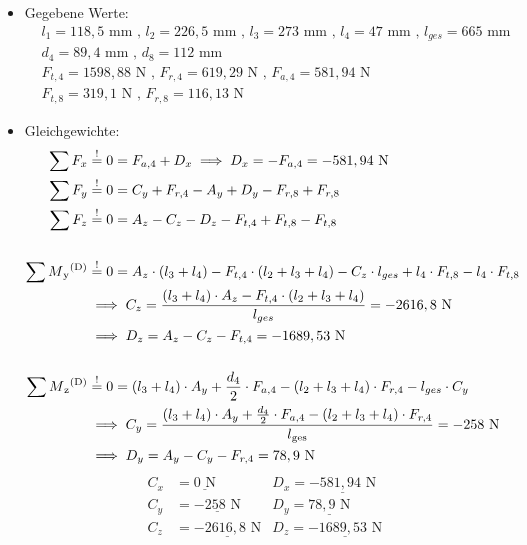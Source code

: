 \begin{itemize}
	\item Gegebene Werte: 
	\begin{align*}
	&l_{1} =118,5\text{ mm} \text{ , } l_{2} = 226,5\text{ mm} \text{ , } l_{3} = 273 \text{ mm} \text{ , } l_{4} = 47\text{ mm} \text{ , } l_{ges} = 665\text{ mm} \\
	&d_4 = 89,4\text{ mm} \text{ , } d_8 = 112 \text{ mm} \\
	&F_{t,4} = 1598,88 \text{ N} \text{ , } F_{r,4}  = 619,29\text{ N} \text{ , } F_{a,4} = 581,94 \text{ N} \\
	&F_{t,8} = 319,1 \text{ N} \text{ , } F_{r,8}  = 116,13\text{ N}
\end{align*}
	\item Gleichgewichte:
\begin{align*}
    \sum F_x &\overset{!}{=} 0 = F_{a,4} + D_x \implies D_x = -F_{a,4} = -581,94 \text{ N} \\
    \sum F_y &\overset{!}{=} 0 = C_y + F_{r,4}-A_y +D_y - F_{r,8} + F_{r,8}\\ 
    \sum F_z &\overset{!}{=} 0 = A_z - C_z - D_z - F_{t,4} + F_{t,8} - F_{t,8}\\ \\
    \sum M\textsubscript{y}\textsuperscript{(D)} &\overset{!}{=} 0 = A_z \cdot (l_3+l_4)- F_{t,4} \cdot (l_2+l_3+l_4) - C_z \cdot l_{ges} +l_4 \cdot F_{t,8}- l_4 \cdot F_{t,8} \\ 
    &\implies C_z = \frac{(l_3+l_4) \cdot A_z - F_{t,4} \cdot (l_2+l_3+l_4)}{l_{ges}} = -2616,8 \text { N} \\ 
    & \implies D_z = A_z - C_z - F_{t,4}= -1689,53 \text{ N}\\ \\
    \sum M\textsubscript{z}\textsuperscript{(D)} &\overset{!}{=} 0 = (l_3+l_4) \cdot A_y + \frac{d_4}{2} \cdot F_{a,4} - (l_2+l_3+l_4) \cdot F_{r,4}- l_{ges} \cdot C_y  \\ 
    &\implies C_y = \frac{(l_3+l_4) \cdot A_y + \frac{d_4}{2} \cdot F_{a,4} - (l_2+l_3+l_4) \cdot F_{r,4}}{l\textsubscript{ges}} = -258 \text{ N}\\ 
    & \implies D_y =   A_y - C_y - F_{r,4} =  78,9\text{ N}\\ 
\end{align*}
\begin{align*}
    C_x &= \underline{0\text{ N}} & D_x= \underline{-581,94\text{ N}}\\
    C_y &= \underline{-258\text{ N}} & D_y= \underline{78,9\text{ N}}\\
    C_z &= \underline{-2616,8\text{ N}} & D_z= \underline{-1689,53\text{ N}}\\
\end{align*}
\end{itemize}
\newpage
